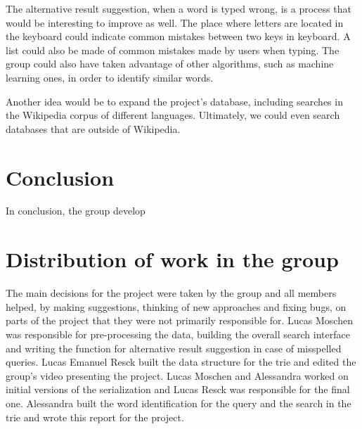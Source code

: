\documentclass{article}
\begin{document}
The alternative result suggestion, when a word is typed wrong, is a process that would be interesting to improve as well. The place where letters are located in the keyboard could indicate common mistakes between two keys in keyboard. A list could also be made of common mistakes made by users when typing. The group could also have taken advantage of other algorithms, such as machine learning ones, in order to identify similar words. 

Another idea would be to expand the project's database, including searches in the Wikipedia corpus of different languages. Ultimately, we could even search databases that are outside of Wikipedia. 

\section*{Conclusion}
In conclusion, the group develop

\section*{Distribution of work in the group}
The main decisions for the project were taken by the group and all members helped, by making suggestions, thinking of new approaches and fixing bugs, on parts of the project that they were not primarily responsible for. Lucas Moschen was responsible for pre-processing the data, building the overall search interface and writing the function for alternative result suggestion in case of misspelled queries. Lucas Emanuel Resck built the data structure for the trie and edited the group's video presenting the project. Lucas Moschen and Alessandra worked on initial versions of the serialization and Lucas Resck was responsible for the final one. Alessandra built the word identification for the query and the search in the trie and wrote this report for the project. 

\end{document}
